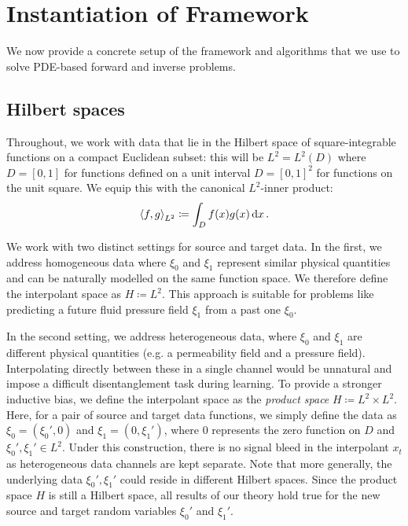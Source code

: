 \section{Instantiation of Framework}
We now provide a concrete setup of the framework and algorithms that we use to solve PDE-based forward and inverse problems.

\subsection{Hilbert spaces} \label{sec:hs}
Throughout, we work with data that lie in the Hilbert space of square-integrable functions on a compact Euclidean subset: this will be \(L^{2} = L^{2}(D)\) where \(D = [0, 1]\) for functions defined on a unit interval \(D = [0, 1]^{2}\) for functions on the unit square. We equip this with the canonical \(L^{2}\)-inner product:
\[
  \ev{f, g}_{L^{2}} \coloneqq \int_{D} f(x) g(x) \dd{x}.
\]

We work with two distinct settings for source and target data. In the first, we address homogeneous data where \(\xi_{0}\) and \(\xi_{1}\) represent similar physical quantities and can be naturally modelled on the same function space. We therefore define the interpolant space as  \(H \coloneqq L^{2}\). This approach is suitable for problems like predicting a future fluid pressure field \(\xi_{1}\) from a past one \(\xi_{0}\).

In the second setting, we address heterogeneous data, where \(\xi_{0}\) and \(\xi_{1}\) are different physical quantities (e.g. a permeability field and a pressure field). Interpolating directly between these in a single channel would be unnatural and impose a difficult disentanglement task during learning. To provide a stronger inductive bias, we define the interpolant space as the \textit{product space} \(H \coloneqq L^{2} \times L^{2}\). Here, for a pair of source and target data functions, we simply define the data as \(\xi_{0} = (\xi_{0}', 0)\) and \(\xi_{1} = (0, \xi_{1}')\), where \(0\) represents the zero function on \(D\) and \(\xi_{0}', \xi_{1}' \in L^{2}\). Under this construction,  there is no signal bleed in the interpolant \(x_{t}\)  as heterogeneous data channels are kept separate. Note that more generally, the underlying data \(\xi_{0}', \xi_{1}'\) could reside in different Hilbert spaces. Since the product space \(H\) is still a Hilbert space, all results of our theory hold true for the new source and target random variables \(\xi_{0}'\) and \(\xi_{1}'\).

